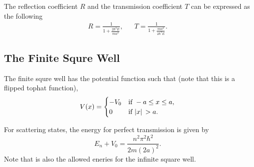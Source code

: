 \documentclass[a4paper]{article}
\begin{document}
\par The reflection coefficient $R$ and the transmission coefficient $T$ can be expressed as the following
\begin{align*}
    R = \frac{1}{1+\frac{2\hbar^2E}{m\alpha^2}}, &&  T = \frac{1}{1+\frac{m\alpha^2}{2\hbar^2E}}.
\end{align*}

\subsection{The Finite Squre Well}
\par The finite squre well has the potential function such that (note that this is a flipped tophat function),
\[
    V(x) = 
        \begin{cases}
            -V_{0} & \text{if } -a \leq x \leq a,\\
            0 & \text{if } \abs*{x} > a.
        \end{cases}    
\]
\par For scattering states, the energy for perfect transmission is given by 
\[
    E_{n}+V_{0} = \frac{n^2\pi^2\hbar^2}{2m(2a)^2}.
\]  
Note that is also the allowed eneries for the infinite square well.










\end{document}
